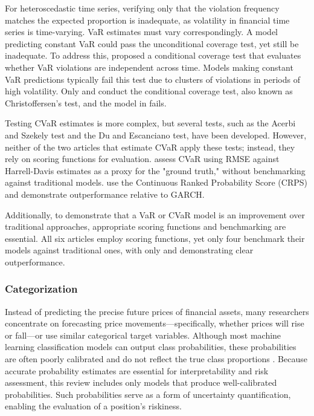 For heteroscedastic time series, verifying only that the violation frequency matches the expected proportion is inadequate, as volatility in financial time series is time-varying. VaR estimates must vary correspondingly. A model predicting constant VaR could pass the unconditional coverage test, yet still be inadequate. To address this, \textcite{Christoffersen1998} proposed a conditional coverage test that evaluates whether VaR violations are independent across time. Models making constant VaR predictions typically fail this test due to clusters of violations in periods of high volatility. Only \textcite{Fatouros2023DeepVaR} and \textcite{arian2022encoded} conduct the conditional coverage test, also known as Christoffersen's test, and the model in \textcite{arian2022encoded} fails.

Testing CVaR estimates is more complex, but several tests, such as the Acerbi and Szekely test and the Du and Escanciano test, have been developed. However, neither of the two articles that estimate CVaR apply these tests; instead, they rely on scoring functions for evaluation. \textcite{Risk2018gpr} assess CVaR using RMSE against Harrell-Davis estimates as a proxy for the "ground truth," without benchmarking against traditional models. \textcite{Almeida2024RiskForecasting} use the Continuous Ranked Probability Score (CRPS) and demonstrate outperformance relative to GARCH.

Additionally, to demonstrate that a VaR or CVaR model is an improvement over traditional approaches, appropriate scoring functions and benchmarking are essential. All six articles employ scoring functions, yet only four benchmark their models against traditional ones, with only \textcite{Fatouros2023DeepVaR} and \textcite{Horenko2020} demonstrating clear outperformance.





\subsubsection{Categorization}
Instead of predicting the precise future prices of financial assets, many researchers concentrate on forecasting price movements—specifically, whether prices will rise or fall—or use similar categorical target variables. Although most machine learning classification models can output class probabilities, these probabilities are often poorly calibrated and do not reflect the true class proportions \parencite{guo2017calibration, NiculescuMizil2005}. Because accurate probability estimates are essential for interpretability and risk assessment, this review includes only models that produce well-calibrated probabilities. Such probabilities serve as a form of uncertainty quantification, enabling the evaluation of a position's riskiness.


